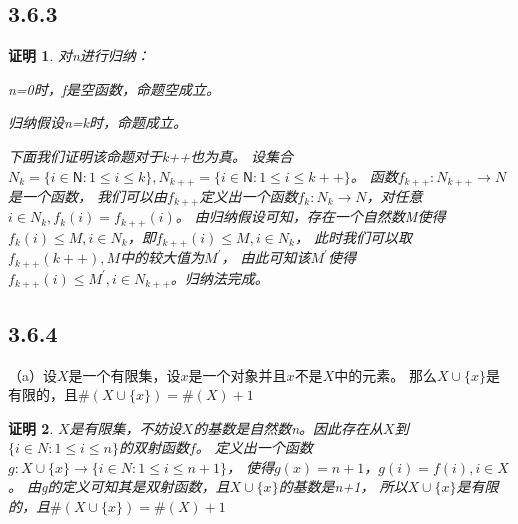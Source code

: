 \documentclass{article}
\theoremstyle{mystyle}
\theoremstyle{zproofstyle}
\newtheorem*{zproof}{证明}
\begin{document}
\subsection*{3.6.3}
\begin{zproof}
  对n进行归纳：

  n=0时，f是空函数，命题空成立。

  归纳假设n=k时，命题成立。

  下面我们证明该命题对于k++也为真。
  设集合$N_k = \{i \in \mathsf{N}: 1 \leq i \leq k\}, N_{k++} = \{i \in \mathsf{N}: 1 \leq i \leq k++\}$。
  函数$f_{k++}: N_{k++} \rightarrow N$是一个函数，
  我们可以由$f_{k++}$定义出一个函数$f_k: N_k \rightarrow N$，对任意$i \in N_k, f_k(i) = f_{k++}(i)$。
  由归纳假设可知，存在一个自然数M使得$f_k(i) \leq M, i \in N_k$，即$f_{k++}(i) \leq M, i \in N_k$，
  此时我们可以取$f_{k++}(k++), M$中的较大值为$M^\prime$，
  由此可知该$M^\prime$使得$f_{k++}(i) \leq M^\prime, i \in N_{k++}$。归纳法完成。
\end{zproof}

\subsection*{3.6.4}

（a）设$X$是一个有限集，设$x$是一个对象并且$x$不是$X$中的元素。
那么$X \cup \{x\}$是有限的，且$\# (X \cup \{x\}) = \# (X) + 1$
\begin{zproof}
  $X$是有限集，不妨设$X$的基数是自然数n。因此存在从$X$到$\{i \in N: 1 \leq i \leq n\}$的双射函数$f$。
  定义出一个函数$g: X \cup \{x\} \rightarrow \{i \in N: 1 \leq i \leq n+1\}$，
  使得$g(x) = n+1$，$g(i) = f(i), i \in X$。
  由g的定义可知其是双射函数，且$X \cup \{x\}$的基数是n+1，
  所以$X \cup \{x\}$是有限的，且$\# (X \cup \{x\}) = \# (X) + 1$
\end{zproof}
\end{document}
